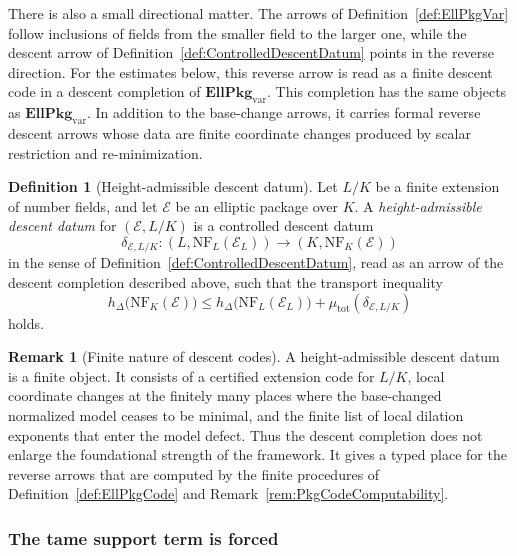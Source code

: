 \documentclass[10pt, reqno]{amsart}
\theoremstyle{plain}
\theoremstyle{definition}
\newtheorem{definition}[theorem]{Definition}
\newtheorem{remark}[theorem]{Remark}
\theoremstyle{plain}
\begin{document}
There is also a small directional matter. The arrows of Definition~\ref{def:EllPkgVar} follow inclusions of fields from the smaller field to the larger one, while the descent arrow of Definition~\ref{def:ControlledDescentDatum} points in the reverse direction. For the estimates below, this reverse arrow is read as a finite descent code in a descent completion of $\mathbf{EllPkg}_{\mathrm{var}}$. This completion has the same objects as $\mathbf{EllPkg}_{\mathrm{var}}$. In addition to the base-change arrows, it carries formal reverse descent arrows whose data are finite coordinate changes produced by scalar restriction and re-minimization.

\begin{definition}[Height-admissible descent datum]\label{def:HeightAdmissibleDescentDatum}
Let $L/K$ be a finite extension of number fields, and let $\mathcal{E}$ be an elliptic package over $K$. A \emph{height-admissible descent datum} for $(\mathcal{E},L/K)$ is a controlled descent datum
\[
  \delta_{\mathcal{E},L/K}
  \colon
  (L,\mathrm{NF}_{L}(\mathcal{E}_{L}))
  \longrightarrow
  (K,\mathrm{NF}_{K}(\mathcal{E}))
\]
in the sense of Definition~\ref{def:ControlledDescentDatum}, read as an arrow of the descent completion described above, such that the transport inequality
\[
  h_{\Delta}\bigl(\mathrm{NF}_{K}(\mathcal{E})\bigr)
  \le
  h_{\Delta}\bigl(\mathrm{NF}_{L}(\mathcal{E}_{L})\bigr)
  +
  \mu_{\mathrm{tot}}(\delta_{\mathcal{E},L/K})
\]
holds.
\end{definition}

\begin{remark}[Finite nature of descent codes]\label{rem:FiniteDescentCodes}
A height-admissible descent datum is a finite object. It consists of a certified extension code for $L/K$, local coordinate changes at the finitely many places where the base-changed normalized model ceases to be minimal, and the finite list of local dilation exponents that enter the model defect. Thus the descent completion does not enlarge the foundational strength of the framework. It gives a typed place for the reverse arrows that are computed by the finite procedures of Definition~\ref{def:EllPkgCode} and Remark~\ref{rem:PkgCodeComputability}.
\end{remark}

\subsubsection{The tame support term is forced}\label{subsubsec:QuadraticTwistObstruction}
\end{document}
